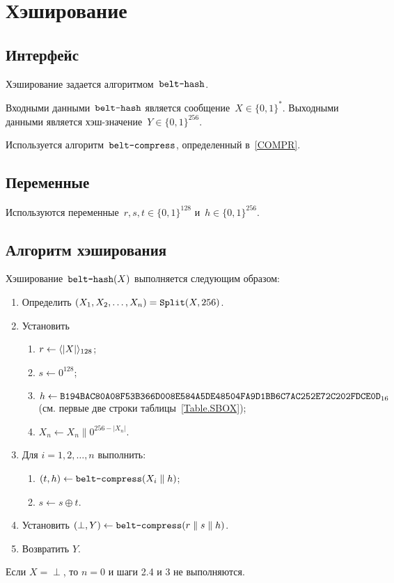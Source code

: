 \section{Хэширование}\label{HASH}

\subsection{Интерфейс}\label{HASH.IFace}

Хэширование задается алгоритмом~$\texttt{belt-hash}$.

Входными данными~$\texttt{belt-hash}$ является сообщение~$X\in\{0,1\}^*$.
%
Выходными данными является хэш-значение~$Y\in\{0,1\}^{256}$.

Используется алгоритм~$\texttt{belt-compress}$, определенный в~\ref{COMPR}.

\subsection{Переменные}\label{HASH.Vars}

Используются переменные~$r,s,t\in\{0,1\}^{128}$ и~$h\in\{0,1\}^{256}$.

\subsection{Алгоритм хэширования}\label{HASH.Alg}

Хэширование~$\texttt{belt-hash}(X)$ выполняется следующим образом:
\begin{enumerate}
\item
Определить $(X_1,X_2,\ldots,X_n)=\mathop{\texttt{Split}}\nolimits(X, 256)$.

\item
Установить
\begin{enumerate}
\item
$r\leftarrow \langle|X|\rangle_{128}$;
\item
$s\leftarrow 0^{128}$;
\item
$h\leftarrow\texttt{B194BAC80A08F53B366D008E584A5DE48504FA9D1BB6C7AC252E72C202FDCE0D}_{16}$ 
(см. первые две строки таблицы~\ref{Table.SBOX});
\item
$X_n\leftarrow X_n \parallel 0^{256-|X_n|}$.
\end{enumerate}

\item
Для $i=1,2,\ldots,n$ выполнить:
\begin{enumerate}
\item
$(t,h)\leftarrow\texttt{belt-compress}(X_i\parallel h)$;
\item
$s\leftarrow s\oplus t$.
\end{enumerate}

\item
Установить 
$(\perp,Y)\leftarrow\texttt{belt-compress}(r\parallel s\parallel h)$.

\item
Возвратить $Y$.
\end{enumerate}

\begin{note*}
Если $X=\perp$, то $n=0$ и шаги 2.4 и 3 не выполняются.
\end{note*}
